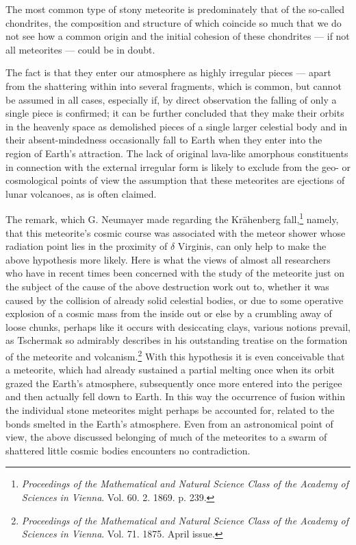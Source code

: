 \documentclass[a4paper, 12pt, oneside]{article}
\begin{document}
The most common type of stony meteorite is predominately that of the so-called chondrites, the composition and structure of which coincide so much that we do not see how a common origin and the initial cohesion of these chondrites --- if not all meteorites --- could be in doubt.

The fact is that they enter our atmosphere as highly irregular pieces --- apart from the shattering within into several fragments, which is common, but cannot be assumed in all cases, especially if, by direct observation the falling of only a single piece is confirmed; it can be further concluded that they make their orbits in the heavenly space as demolished pieces of a single larger celestial body and in their absent-mindedness occasionally fall to Earth when they enter into the region of Earth's attraction. The lack of original lava-like amorphous constituents in connection with the external irregular form is likely to exclude from the geo- or cosmological points of view the assumption that these meteorites are ejections of lunar volcanoes, as is often claimed.

The remark, which G. Neumayer made regarding the Krähenberg fall,\footnote{\emph{Proceedings of the Mathematical and Natural Science Class of the Academy of Sciences in Vienna}. Vol. 60. 2. 1869. p. 239.} namely, that this meteorite's cosmic course was associated with the meteor shower whose radiation point lies in the proximity of $\delta$ Virginis, can only help to make the above hypothesis more likely. Here is what the views of almost all researchers who have in recent times been concerned with the study of the meteorite just on the subject of the cause of the above destruction work out to, whether it was caused by the collision of already solid celestial bodies, or due to some operative explosion of a cosmic mass from the inside out or else by a crumbling away of loose chunks, perhaps like it occurs with desiccating clays, various notions prevail, as Tschermak so admirably describes in his outstanding treatise on the formation of the meteorite and volcanism.\footnote{\emph{Proceedings of the Mathematical and Natural Science Class of the Academy of Sciences in Vienna}. Vol. 71. 1875. April issue.} With this hypothesis it is even conceivable that a meteorite, which had already sustained a partial melting once when its orbit grazed the Earth's atmosphere, subsequently once more entered into the perigee and then actually fell down to Earth. In this way the occurrence of fusion within the individual stone meteorites might perhaps be accounted for, related to the bonds smelted in the Earth's atmosphere. Even from an astronomical point of view, the above discussed belonging of much of the meteorites to a swarm of shattered little cosmic bodies encounters no contradiction.
\end{document}
